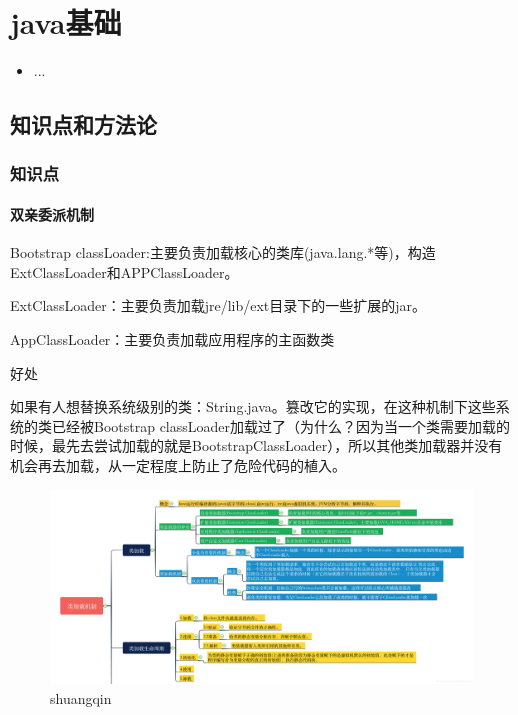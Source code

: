 \chapter{java基础}
\label{chap1}
\begin{itemize}[noitemsep,topsep=0pt,parsep=0pt,partopsep=0pt]
	\item ...
\end{itemize}

\section{知识点和方法论}

\subsection{知识点}
\subsubsection{双亲委派机制}
Bootstrap classLoader:主要负责加载核心的类库(java.lang.*等)，构造ExtClassLoader和APPClassLoader。

ExtClassLoader：主要负责加载jre/lib/ext目录下的一些扩展的jar。

AppClassLoader：主要负责加载应用程序的主函数类

好处

如果有人想替换系统级别的类：String.java。篡改它的实现，在这种机制下这些系统的类已经被Bootstrap classLoader加载过了（为什么？因为当一个类需要加载的时候，最先去尝试加载的就是BootstrapClassLoader），所以其他类加载器并没有机会再去加载，从一定程度上防止了危险代码的植入。

\begin{figure}
	\centering
	\includegraphics[width=1\linewidth]{figures/shuangqin.png}
	\caption{shuangqin}
	\label{fig:shuangqin}
\end{figure}


